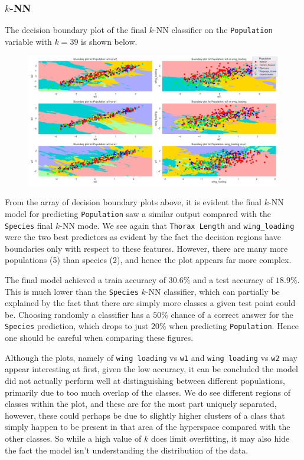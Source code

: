 \documentclass{article}
\begin{document}
\subsubsection{$k$-NN}

The decision boundary plot of the final $k$-NN classifier on the \texttt{Population} variable with $k = 39$ is shown below.

\begin{figure}
    \centering
    \includegraphics{plots/knn_Thorax_decision_boundaries_Population.png}
    \caption{}
    \label{fig:}
\end{figure}


From the array of decision boundary plots above, it is evident the final $k$-NN model for predicting \texttt{Population} saw a similar output compared with the \texttt{Species} final $k$-NN mode. We see again that \texttt{Thorax Length} and \texttt{wing_loading} were the two best predictors as evident by the fact the decision regions have boundaries only with respect to these features. However, there are many more populations (5) than species (2), and hence the plot appears far more complex.

The final model achieved a train accuracy of $30.6\%$ and a test accuracy of $18.9\%$. This is much lower than the \texttt{Species} $k$-NN classifier, which can partially be explained by the fact that there are simply more classes a given test point could be. Choosing randomly a classifier has a $50\%$ chance of a correct answer for the \texttt{Species} prediction, which drops to just $20\%$ when predicting \texttt{Population}. Hence one should be careful when comparing these figures.

Although the plots, namely of \texttt{wing loading} vs \texttt{w1} and \texttt{wing loading} vs \texttt{w2} may appear interesting at first, given the low accuracy, it can be concluded the model did not actually perform well at distinguishing between different populations, primarily due to too much overlap of the classes. We do see different regions of classes within the plot, and these are for the most part uniquely separated, however, these could perhaps be due to slightly higher clusters of a class that simply happen to be present in that area of the hyperspace compared with the other classes. So while a high value of $k$ does limit overfitting, it may also hide the fact the model isn't understanding the distribution of the data.
\end{document}
